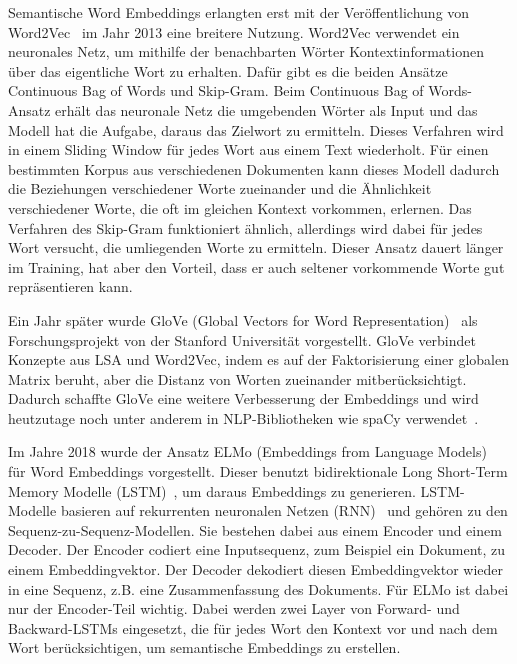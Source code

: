 Semantische Word Embeddings erlangten erst mit der Veröffentlichung von Word2Vec~\cite{mikolov2013} im Jahr 2013 eine breitere Nutzung.
Word2Vec verwendet ein neuronales Netz, um mithilfe der benachbarten Wörter Kontextinformationen über das eigentliche Wort zu erhalten.
Dafür gibt es die beiden Ansätze Continuous Bag of Words und Skip-Gram.
Beim Continuous Bag of Words-Ansatz erhält das neuronale Netz die umgebenden Wörter als Input und das Modell hat die Aufgabe, daraus das Zielwort zu ermitteln.
Dieses Verfahren wird in einem Sliding Window für jedes Wort aus einem Text wiederholt.
Für einen bestimmten Korpus aus verschiedenen Dokumenten kann dieses Modell dadurch die Beziehungen verschiedener Worte zueinander und die Ähnlichkeit verschiedener Worte, die oft im gleichen Kontext vorkommen, erlernen.
Das Verfahren des Skip-Gram funktioniert ähnlich, allerdings wird dabei für jedes Wort versucht, die umliegenden Worte zu ermitteln.
Dieser Ansatz dauert länger im Training, hat aber den Vorteil, dass er auch seltener vorkommende Worte gut repräsentieren kann.~\cite{mikolov2013}

Ein Jahr später wurde GloVe (Global Vectors for Word Representation)~\cite{pennington2014} als Forschungsprojekt von der Stanford Universität vorgestellt.
GloVe verbindet Konzepte aus LSA und Word2Vec, indem es auf der Faktorisierung einer globalen Matrix beruht, aber die Distanz von Worten zueinander mitberücksichtigt.
Dadurch schaffte GloVe eine weitere Verbesserung der Embeddings und wird heutzutage noch unter anderem in NLP-Bibliotheken wie spaCy verwendet~\cite{honnibal2017}.

Im Jahre 2018 wurde der Ansatz ELMo (Embeddings from Language Models)~\cite{peters2018} für Word Embeddings vorgestellt.
Dieser benutzt bidirektionale Long Short-Term Memory Modelle (LSTM)~\cite{hochreiter1997}, um daraus Embeddings zu generieren.
LSTM-Modelle basieren auf rekurrenten neuronalen Netzen (RNN)~\cite{dafontouracosta1996} und gehören zu den Sequenz-zu-Sequenz-Modellen.
Sie bestehen dabei aus einem Encoder und einem Decoder.
Der Encoder codiert eine Inputsequenz, zum Beispiel ein Dokument, zu einem Embeddingvektor.
Der Decoder dekodiert diesen Embeddingvektor wieder in eine Sequenz, z.B. eine Zusammenfassung des Dokuments.
Für ELMo ist dabei nur der Encoder-Teil wichtig.
Dabei werden zwei Layer von Forward- und Backward-LSTMs eingesetzt, die für jedes Wort den Kontext vor und nach dem Wort berücksichtigen, um semantische Embeddings zu erstellen.

